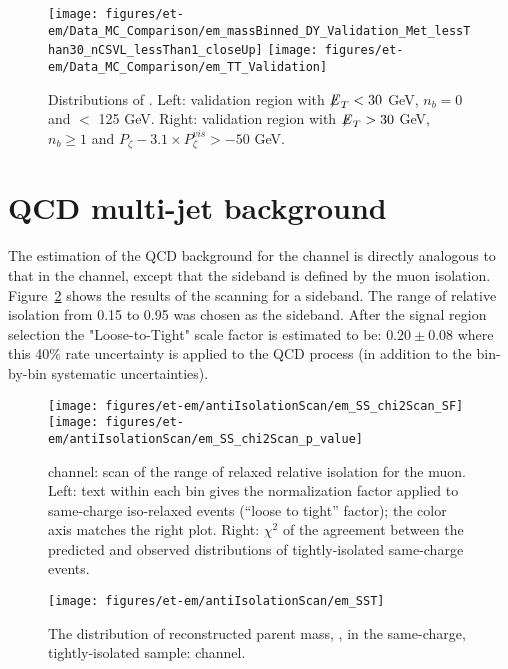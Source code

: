 \begin{figure}\centering
  \texttt{[image: figures/et-em/Data\_MC\_Comparison/em\_massBinned\_DY\_Validation\_Met\_lessThan30\_nCSVL\_lessThan1\_closeUp]}
  \texttt{[image: figures/et-em/Data\_MC\_Comparison/em\_TT\_Validation]}
  \caption{\label{fig:em_dy_tt} Distributions of \meffemu. Left:
    validation region with ${\not\mathrel{E}}_T<30$ GeV, $n_b = 0$ and \meffemu $<$ 125 GeV.  Right:
    validation region with ${\not\mathrel{E}}_T>30$ GeV, $n_b\geq1$ and $P_{\zeta}- 3.1 \times P_{\zeta}^{vis} > -50$ GeV.}
\end{figure}




\section{QCD multi-jet background}\label{sec:em_qcd}
The estimation of the QCD background for the \tetm channel is directly
analogous to that in the \teth channel, except that the sideband is
defined by the muon isolation.  Figure~\ref{fig:em_scans} shows the
results of the scanning for a sideband.  The range of relative
isolation from 0.15 to 0.95 was chosen as the sideband. After the
signal region selection the "Loose-to-Tight" scale factor is estimated
to be: $0.20 \pm 0.08$ where this 40\% rate uncertainty is applied to
the QCD process (in addition to the bin-by-bin systematic
uncertainties).

\begin{figure}\centering
  \texttt{[image: figures/et-em/antiIsolationScan/em\_SS\_chi2Scan\_SF]}
  \texttt{[image: figures/et-em/antiIsolationScan/em\_SS\_chi2Scan\_p\_value]}
  \caption{\label{fig:em_scans} \tetm channel: scan of the range of
    relaxed relative isolation for the muon.  Left: text within each
    bin gives the normalization factor applied to same-charge
    iso-relaxed events (``loose to tight'' factor); the color axis
    matches the right plot.  Right: $\chi^2$ of the agreement between
    the predicted and observed distributions of tightly-isolated
    same-charge events.}
\end{figure}

\begin{figure}\centering
  \texttt{[image: figures/et-em/antiIsolationScan/em\_SST]}
  \caption{\label{fig:em_sst} The distribution of reconstructed parent
    mass, \meffemu, in the same-charge, tightly-isolated sample: \tetm
    channel.}
\end{figure}

